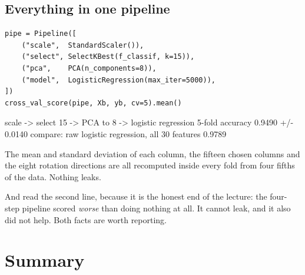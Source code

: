 \documentclass[11pt]{article}
\begin{document}
\subsection{Everything in one pipeline}
\label{sec:pipeline}

\begin{lstlisting}
pipe = Pipeline([
    ("scale",  StandardScaler()),
    ("select", SelectKBest(f_classif, k=15)),
    ("pca",    PCA(n_components=8)),
    ("model",  LogisticRegression(max_iter=5000)),
])
cross_val_score(pipe, Xb, yb, cv=5).mean()
\end{lstlisting}
\begin{codeout}
scale -> select 15 -> PCA to 8 -> logistic regression
   5-fold accuracy 0.9490  +/- 0.0140
   compare: raw logistic regression, all 30 features 0.9789
\end{codeout}

The mean and standard deviation of each column, the fifteen chosen columns and
the eight rotation directions are all recomputed inside every fold from four
fifths of the data. Nothing leaks.

And read the second line, because it is the honest end of the lecture: the
four-step pipeline scored \emph{worse} than doing nothing at all. It cannot
leak, and it also did not help. Both facts are worth reporting.

\notesources{\AMLUnitIVSources}

\section{Summary}
\end{document}

